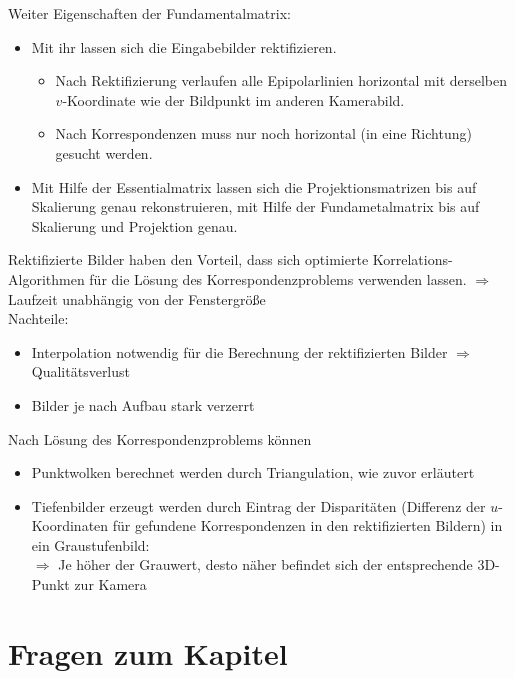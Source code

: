 Weiter Eigenschaften der Fundamentalmatrix:
\begin{itemize}
\item Mit ihr lassen sich die Eingabebilder rektifizieren.
\begin{itemize}
\item Nach Rektifizierung verlaufen alle Epipolarlinien horizontal mit derselben $v$-Koordinate wie der Bildpunkt im anderen Kamerabild.
\item Nach Korrespondenzen muss nur noch horizontal (in eine Richtung) gesucht werden.
\end{itemize}
\item Mit Hilfe der Essentialmatrix lassen sich die Projektionsmatrizen bis auf Skalierung genau rekonstruieren, mit Hilfe der Fundametalmatrix bis auf Skalierung und Projektion genau.
\end{itemize}
Rektifizierte Bilder haben den Vorteil, dass sich optimierte Korrelations-Algorithmen für die Lösung des Korrespondenzproblems verwenden lassen. $\Rightarrow$ Laufzeit unabhängig von der Fenstergröße \\
Nachteile:
\begin{itemize}
\item Interpolation notwendig für die Berechnung der rektifizierten Bilder $\Rightarrow$ Qualitätsverlust
\item Bilder je nach Aufbau stark verzerrt
\end{itemize}
Nach Lösung des Korrespondenzproblems können
\begin{itemize}
\item Punktwolken berechnet werden durch Triangulation, wie zuvor erläutert
\item Tiefenbilder erzeugt werden durch Eintrag der Disparitäten (Differenz der $u$-Koordinaten für gefundene Korrespondenzen in den rektifizierten Bildern) in ein Graustufenbild: \\ $\Rightarrow$ Je höher der Grauwert, desto näher befindet sich der entsprechende 3D-Punkt zur Kamera
\end{itemize}



\section{Fragen zum Kapitel}
